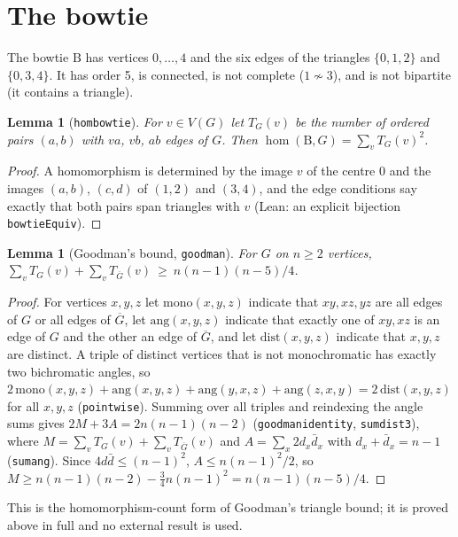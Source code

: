\documentclass[11pt]{article}
\newtheorem{lemma}[theorem]{Lemma}
\theoremstyle{definition}
\theoremstyle{remark}
\renewcommand{\_}{\oldus\allowbreak}
\newcommand{\homc}{\operatorname{hom}}
\newcommand{\B}{\mathrm{B}}
\begin{document}
\section{The bowtie}

The bowtie $\B$ has vertices $0,\dots,4$ and the six edges of the triangles $\{0,1,2\}$ and $\{0,3,4\}$. It has
order 5, is connected, is not complete ($1\not\sim3$), and is not bipartite (it contains a triangle).

\begin{lemma}[\texttt{hom\_bowtie}]
For $v\in V(G)$ let $T_G(v)$ be the number of ordered pairs $(a,b)$ with $va$, $vb$, $ab$ edges of $G$. Then
$\homc(\B,G)=\sum_v T_G(v)^2$.
\end{lemma}
\begin{proof}
A homomorphism is determined by the image $v$ of the centre $0$ and the images $(a,b)$, $(c,d)$ of $(1,2)$ and
$(3,4)$, and the edge conditions say exactly that both pairs span triangles with $v$ (Lean: an explicit
bijection \texttt{bowtieEquiv}).
\end{proof}

\begin{lemma}[Goodman's bound, \texttt{goodman}]
For $G$ on $n\ge2$ vertices, $\sum_v T_G(v)+\sum_v T_{\overline G}(v)\ \ge\ n(n-1)(n-5)/4$.
\end{lemma}
\begin{proof}
For vertices $x,y,z$ let $\mathrm{mono}(x,y,z)$ indicate that $xy,xz,yz$ are all edges of $G$ or all edges of
$\overline G$, let $\mathrm{ang}(x,y,z)$ indicate that exactly one of $xy,xz$ is an edge of $G$ and the other an
edge of $\overline G$, and let $\mathrm{dist}(x,y,z)$ indicate that $x,y,z$ are distinct. A triple of distinct
vertices that is not monochromatic has exactly two bichromatic angles, so
$2\,\mathrm{mono}(x,y,z)+\mathrm{ang}(x,y,z)+\mathrm{ang}(y,x,z)+\mathrm{ang}(z,x,y)=2\,\mathrm{dist}(x,y,z)$
for all $x,y,z$ (\texttt{pointwise}). Summing over all triples and reindexing the angle sums gives
$2M+3A=2n(n-1)(n-2)$ (\texttt{goodman\_identity}, \texttt{sum\_dist3}), where
$M=\sum_v T_G(v)+\sum_v T_{\overline G}(v)$ and $A=\sum_x 2d_x\bar d_x$ with $d_x+\bar d_x=n-1$
(\texttt{sum\_ang}). Since $4d\bar d\le(n-1)^2$, $A\le n(n-1)^2/2$, so $M\ge n(n-1)(n-2)-\tfrac34 n(n-1)^2
=n(n-1)(n-5)/4$.
\end{proof}
This is the homomorphism-count form of Goodman's triangle bound; it is proved above in full and no
external result is used.
\end{document}
